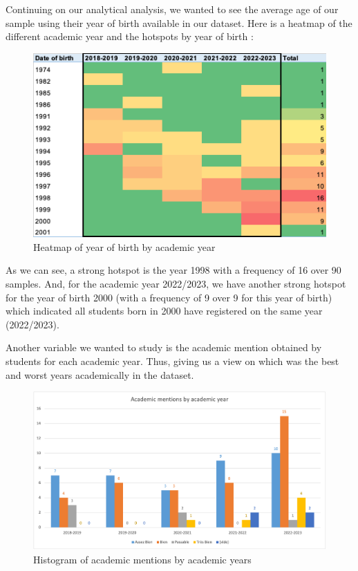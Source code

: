 \documentclass[../main.tex]{subfiles}
\begin{document}
Continuing on our analytical analysis, we wanted to see the average age of our sample using their year of birth available in our dataset. Here is a heatmap of the different academic year and the hotspots by year of birth : 
\begin{figure}[H]      
    \includegraphics[width=1\linewidth]{res/graph/data_analysis/raw/heatymap_year.png}
    \caption{Heatmap of year of birth by academic year}
    \label{fig:heatmap_dob_acayear}
\end{figure}

As we can see, a strong hotspot is the year 1998 with a frequency of 16 over 90 samples. And, for the academic year 2022/2023, we have another strong hotspot for the year of birth 2000 (with a frequency of 9 over 9 for this year of birth) which indicated all students born in 2000 have registered on the same year (2022/2023).

Another variable we wanted to study is the academic mention obtained by students for each academic year. Thus, giving us a view on which was the best and worst years academically in the dataset.
\begin{figure}[H]      
    \includegraphics[width=1\linewidth]{res/graph/data_analysis/raw/academicmentions_academic_year.png}
    \caption{Histogram of academic mentions by academic years}
    \label{fig:hist_acament_acayear}
\end{figure}
\end{document}
